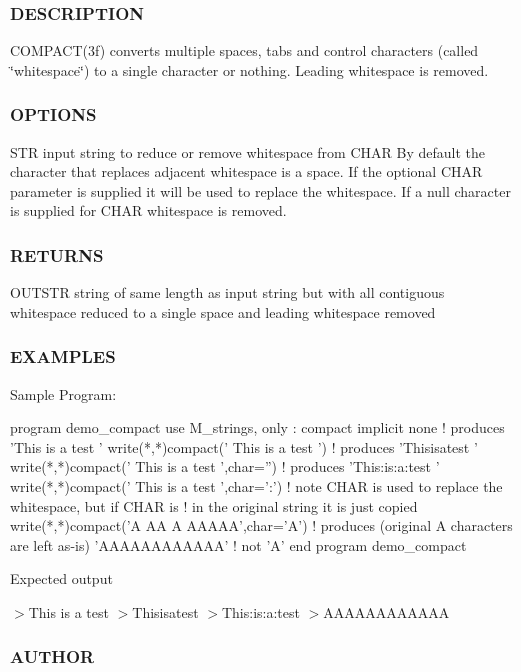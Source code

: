  \subsubsection*{D\+E\+S\+C\+R\+I\+P\+T\+I\+ON}

C\+O\+M\+P\+A\+C\+T(3f) converts multiple spaces, tabs and control characters (called \char`\"{}whitespace\char`\"{}) to a single character or nothing. Leading whitespace is removed.

\subsubsection*{O\+P\+T\+I\+O\+NS}

S\+TR input string to reduce or remove whitespace from C\+H\+AR By default the character that replaces adjacent whitespace is a space. If the optional C\+H\+AR parameter is supplied it will be used to replace the whitespace. If a null character is supplied for C\+H\+AR whitespace is removed. \subsubsection*{R\+E\+T\+U\+R\+NS}

O\+U\+T\+S\+TR string of same length as input string but with all contiguous whitespace reduced to a single space and leading whitespace removed

\subsubsection*{E\+X\+A\+M\+P\+L\+ES}

Sample Program\+: \begin{DoxyVerb}program demo_compact
 use M_strings, only : compact
 implicit none
 ! produces 'This is a test               '
 write(*,*)compact('  This     is      a     test  ')
 ! produces 'Thisisatest                  '
 write(*,*)compact('  This     is      a     test  ',char='')
 ! produces 'This:is:a:test               '
 write(*,*)compact('  This     is      a     test  ',char=':')
 ! note CHAR is used to replace the whitespace, but if CHAR is
 ! in the original string it is just copied
 write(*,*)compact('A  AA    A   AAAAA',char='A')
 ! produces (original A characters are left as-is) 'AAAAAAAAAAAA'
 ! not 'A'
end program demo_compact
\end{DoxyVerb}


Expected output

$>$This is a test $>$Thisisatest $>$This\+:is\+:a\+:test $>$A\+A\+A\+A\+A\+A\+A\+A\+A\+A\+AA \subsubsection*{A\+U\+T\+H\+OR}

